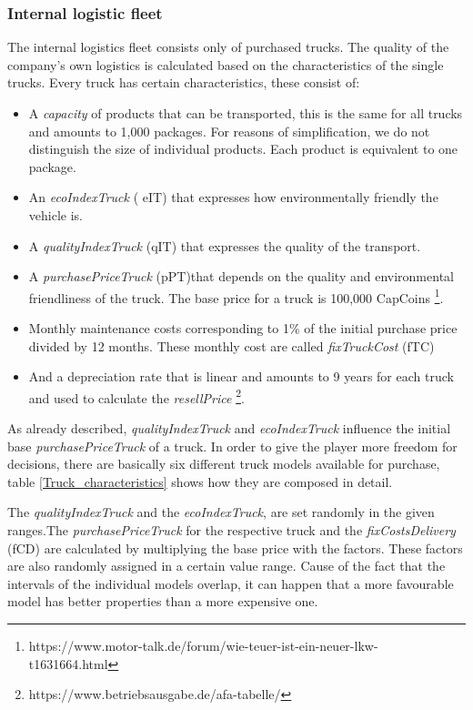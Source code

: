 \subsubsection{Internal logistic fleet}
The internal logistics fleet consists only of purchased trucks. The quality of the company's own logistics is calculated based on the characteristics of the single trucks. Every truck has certain characteristics, these consist of:
\begin{itemize}
    \item A \textit{capacity} of products that can be transported, this is the same for all trucks and amounts to 1,000 packages. For reasons of simplification, we do not distinguish the size of individual products.  Each product is equivalent to one package. 
    \item An \textit{ecoIndexTruck} ( \gls{eIT}) that expresses how environmentally friendly the vehicle is.
    \item A \textit{qualityIndexTruck} (\gls{qIT}) that expresses the quality of the transport.
    \item A \textit{purchasePriceTruck} (\gls{pPT})that depends on the quality and environmental friendliness of the truck. The base price for a truck is 100,000 CapCoins 
    \footnote{https://www.motor-talk.de/forum/wie-teuer-ist-ein-neuer-lkw-t1631664.html}.
    \item Monthly maintenance costs corresponding to 1\% of the initial purchase price divided by 12 months. These monthly cost are called \textit{fixTruckCost} (\gls{fTC})
    \item And a depreciation rate that is linear and amounts to 9 years for each truck and used to calculate the \textit{resellPrice}  \footnote{https://www.betriebsausgabe.de/afa-tabelle/}.
\end{itemize}

As already described, \textit{qualityIndexTruck} and \textit{ecoIndexTruck} influence the initial base 
\textit{purchasePriceTruck} of a truck. In order to give the player more freedom for decisions, there are basically six different truck models available for purchase, table \ref{Truck_characteristics} shows how they are composed in detail.

The \textit{qualityIndexTruck} and the \textit{ecoIndexTruck}, are set randomly in the given ranges.The \textit{purchasePriceTruck} for the respective truck and the \textit{fixCostsDelivery} (\gls{fCD}) are calculated by multiplying the base price with the factors. These factors are also randomly assigned in a certain value range. Cause of the fact that the intervals of the individual models overlap, it can happen that a more favourable model has better properties than a more expensive one.

